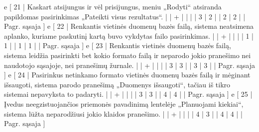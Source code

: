 {%
  e [ 21 | Kaskart atsijungus ir vėl prisijungus, meniu „Rodyti“ atsiranda papildomas
  pasirinkimas „Pateikti visus rezultatus“.
                    |   | + |   |   |   | 3 | 2 |   | 2 | 2 |      | Pagr. sąsaja ]
  e [ 22 | Renkantis vietinės duomenų bazės failą, sistema neatsimena aplanko,
  kuriame paskutinį kartą buvo vykdytas failo pasirinkimas.
                    |   | + |   |   |   | 1 | 1 |   | 1 | 1 |      | Pagr. sąsaja ]
  e [ 23 | Renkantis vietinės duomenų bazės failą, sistema leidžia pasirinkti
  bet kokio formato failą ir neparodo jokio pranešimo nei naudotojo sąsajoje,
  nei pranešimų žurnale.
                    |   | + |   |   |   | 3 | 3 |   | 3 | 3 |      | Pagr. sąsaja ]
  e [ 24 | Pasirinkus netinkamo formato vietinės duomenų bazės failą ir mėginant
  išsaugoti, sistema parodo pranešimą „Duomenys išsaugoti“, tačiau iš tikro sistemai
  nepavyksta to padaryti.
                    |   | + |   |   |   | 3 | 3 |   | 4 | 4 |      | Pagr. sąsaja ]
  e [ 25 | Įvedus neegzistuojančios priemonės pavadinimą lentelėje „Planuojami kiekiai“,
  sistema lūžta neparodžiusi jokio klaidos pranešimo.
                    |   | + |   |   |   | 4 | 3 |   | 4 | 4 |      | Pagr. sąsaja ]
}
